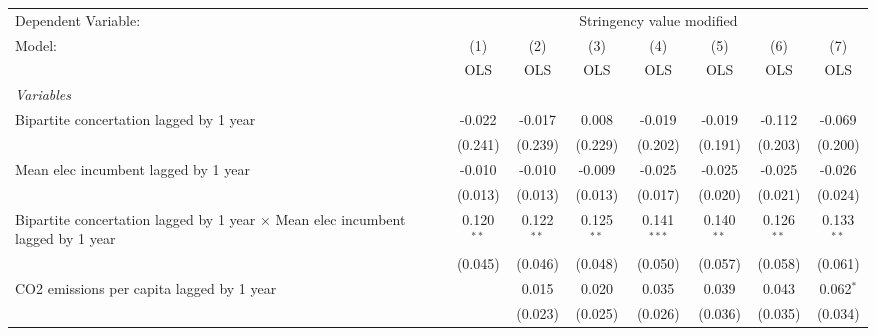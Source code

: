 
\begingroup
\centering
\begin{tabular}{lccccccc}
   \toprule
   Dependent Variable: & \multicolumn{7}{c}{Stringency value modified}\\
   Model:                                                                                 & (1)          & (2)          & (3)          & (4)           & (5)           & (6)           & (7)\\  
                                                                                          &  OLS         & OLS          & OLS          & OLS           & OLS           & OLS           & OLS\\  
   \midrule
   \emph{Variables}\\
   Bipartite concertation lagged by 1 year                                                & -0.022       & -0.017       & 0.008        & -0.019        & -0.019        & -0.112        & -0.069\\   
                                                                                          & (0.241)      & (0.239)      & (0.229)      & (0.202)       & (0.191)       & (0.203)       & (0.200)\\   
   Mean elec incumbent lagged by 1 year                                                   & -0.010       & -0.010       & -0.009       & -0.025        & -0.025        & -0.025        & -0.026\\   
                                                                                          & (0.013)      & (0.013)      & (0.013)      & (0.017)       & (0.020)       & (0.021)       & (0.024)\\   
   Bipartite concertation lagged by 1 year $\times$ Mean elec incumbent lagged by 1 year  & 0.120$^{**}$ & 0.122$^{**}$ & 0.125$^{**}$ & 0.141$^{***}$ & 0.140$^{**}$  & 0.126$^{**}$  & 0.133$^{**}$\\   
                                                                                          & (0.045)      & (0.046)      & (0.048)      & (0.050)       & (0.057)       & (0.058)       & (0.061)\\   
   CO2 emissions per capita lagged by 1 year                                              &              & 0.015        & 0.020        & 0.035         & 0.039         & 0.043         & 0.062$^{*}$\\   
                                                                                          &              & (0.023)      & (0.025)      & (0.026)       & (0.036)       & (0.035)       & (0.034)\\   

\end{tabular}
